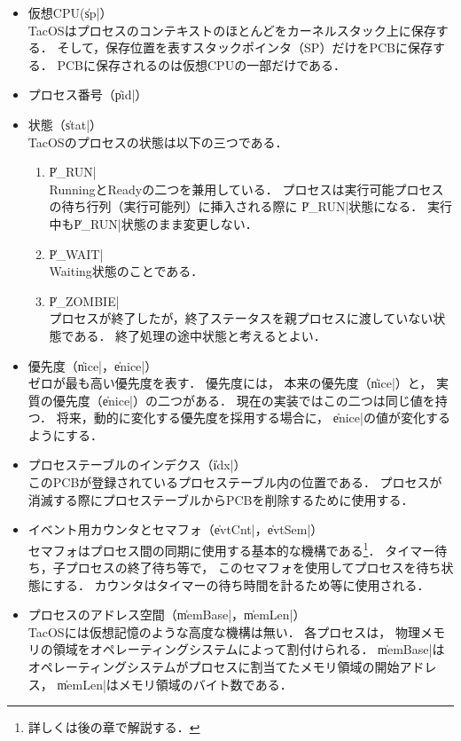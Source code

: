 \begin{itemize}
\item 仮想CPU(\|sp|） \\
TacOSはプロセスのコンテキストのほとんどをカーネルスタック上に保存する．
そして，保存位置を表すスタックポインタ（SP）だけをPCBに保存する．
PCBに保存されるのは仮想CPUの一部だけである．

\item プロセス番号（\|pid|）

\item 状態（\|stat|） \\
TacOSのプロセスの状態は以下の三つである．
\begin{enumerate}
\item \|P_RUN| \\
RunningとReadyの二つを兼用している．
プロセスは実行可能プロセスの待ち行列（実行可能列）に挿入される際に
\|P_RUN|状態になる．
実行中も\|P_RUN|状態のまま変更しない．

\item \|P_WAIT| \\
Waiting状態のことである．

\item \|P_ZOMBIE| \\
プロセスが終了したが，終了ステータスを親プロセスに渡していない状態である．
終了処理の途中状態と考えるとよい．
\end{enumerate}

\item 優先度（\|nice|，\|enice|） \\
ゼロが最も高い優先度を表す．
優先度には，
本来の優先度（\|nice|）と，
実質の優先度（\|enice|）の二つがある．
現在の実装ではこの二つは同じ値を持つ．
将来，動的に変化する優先度を採用する場合に，
\|enice|の値が変化するようにする．

\item プロセステーブルのインデクス（\|idx|） \\
このPCBが登録されているプロセステーブル内の位置である．
プロセスが消滅する際にプロセステーブルからPCBを削除するために使用する．

\item イベント用カウンタとセマフォ（\|evtCnt|，\|evtSem|） \\
セマフォはプロセス間の同期に使用する基本的な機構である\footnote{
詳しくは後の章で解説する．}．
タイマー待ち，子プロセスの終了待ち等で，
このセマフォを使用してプロセスを待ち状態にする．
カウンタはタイマーの待ち時間を計るため等に使用される．

\item プロセスのアドレス空間（\|memBase|，\|memLen|） \\
TacOSには仮想記憶のような高度な機構は無い．
各プロセスは，
物理メモリの領域をオペレーティングシステムによって割付けられる．
\|memBase|は
オペレーティングシステムがプロセスに割当てたメモリ領域の開始アドレス，
\|memLen|はメモリ領域のバイト数である．


\end{itemize}
